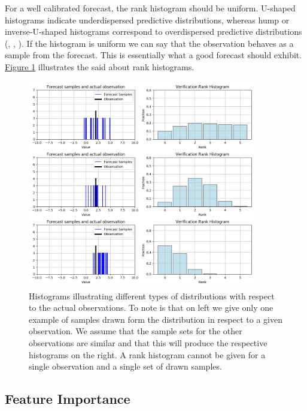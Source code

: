 \documentclass[12pt,a4paper,twoside]{scrartcl}
\numberwithin{equation}{section}
\newcommand{\reffig}[1]{\hyperref[#1]{Figure \ref*{#1}}}
\begin{document}
For a well calibrated forecast, the rank histogram should be uniform. U-shaped histograms indicate underdispersed predictive distributions, whereas hump or inverse-U-shaped histograms correspond to overdispersed predictive distributions (\cite{gneiting2014}, \cite{diebold1998}, \cite{hamill2001}). If the histogram is uniform we can say that the observation behaves as a sample from the forecast. This is essentially what a good forecast should exhibit. \reffig{fig:rank-hist} illustrates the said about rank histograms.

\begin{center}
  \begin{figure}[htbp]
    \label{fig:rank-hist}
    \centering
    \includegraphics[height=0.75\textwidth, width=0.9\textwidth]{figures/verification_histogram.png}
    \caption[Rank Histogram Example]{Histograms illustrating different types of distributions with respect to the actual observations. To note is that on left we give only one example of samples drawn form the distribution in respect to a given observation. We assume that the sample sets for the other observations are similar and that this will produce the respective histograms on the right. A rank histogram cannot be given for a single observation and a single set of drawn samples.}
  \end{figure}
\end{center}
\subsection{Feature Importance}
\label{sec:feature-importance}
\end{document}

